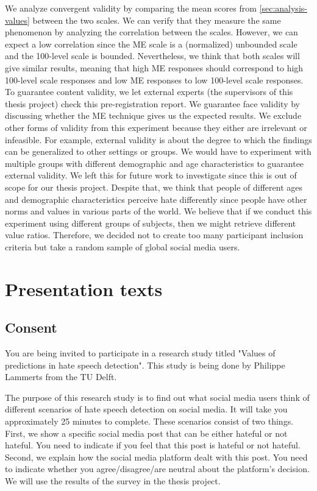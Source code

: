 \documentclass[a4paper]{article}
\begin{document}
We analyze convergent validity by comparing the mean scores from \ref{sec:analysis-values} between the two scales. We can verify that they measure the same phenomenon by analyzing the correlation between the scales. However, we can expect a low correlation since the ME scale is a (normalized) unbounded scale and the 100-level scale is bounded. Nevertheless, we think that both scales will give similar results, meaning that high ME responses should correspond to high 100-level scale responses and low ME responses to low 100-level scale responses. To guarantee content validity, we let external experts (the supervisors of this thesis project) check this pre-registration report. We guarantee face validity by discussing whether the ME technique gives us the expected results. We exclude other forms of validity from this experiment because they either are irrelevant or infeasible. For example, external validity is about the degree to which the findings can be generalized to other settings or groups. We would have to experiment with multiple groups with different demographic and age characteristics to guarantee external validity. We left this for future work to investigate since this is out of scope for our thesis project. Despite that, we think that people of different ages and demographic characteristics perceive hate differently since people have other norms and values in various parts of the world. We believe that if we conduct this experiment using different groups of subjects, then we might retrieve different value ratios. Therefore, we decided not to create too many participant inclusion criteria but take a random sample of global social media users.

\appendix
\section{Presentation texts}
\label{sec:appendix}

\subsection{Consent}
You are being invited to participate in a research study titled "Values of predictions in hate speech detection". This study is being done by Philippe Lammerts from the TU Delft.

The purpose of this research study is to find out what social media users think of different scenarios of hate speech detection on social media. It will take you approximately 25 minutes to complete. These scenarios consist of two things. First, we show a specific social media post that can be either hateful or not hateful. You need to indicate if you feel that this post is hateful or not hateful. Second, we explain how the social media platform dealt with this post. You need to indicate whether you agree/disagree/are neutral about the platform's decision. We will use the results of the survey in the thesis project.
\end{document}

